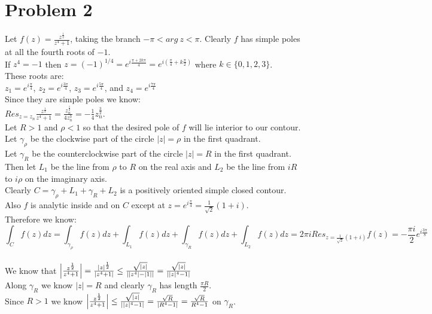 \documentclass{article}
\begin{document}
\section*{Problem 2}
\begin{center}
    \doublespacing
    Let $f(z) =\frac{z^{\frac{1}{2}}}{z^4 + 1}$, taking the branch $-\pi < arg\:z <\pi$. Clearly $f$ has simple poles at all the fourth roots of $-1$.
    \\If $z^4 = -1$ then $z = (-1)^{1/4} = e^{i\frac{\pi + 2k\pi}{4}} = e^{i(\frac{\pi}{4} + k\frac{\pi}{2})}$ where $k\in\{0, 1, 2, 3\}$.
    \\These roots are:
    \\$z_1 = e^{i\frac{\pi}{4}}$, $z_2 = e^{i\frac{3\pi}{4}}$, $z_3 = e^{i\frac{5\pi}{4}}$, and $z_4 = e^{i\frac{7\pi}{4}}$
    \\Since they are simple poles we know:
    \\$Res_{z = z_n}\frac{z^{\frac{1}{2}}}{z^4 + 1} =\frac{z_n^{\frac{1}{2}}}{4z_n^3} = -\frac{1}{4} z_n^{\frac{3}{2}}$.
    \\Let $R > 1$ and $\rho < 1$ so that the desired pole of $f$ will lie interior to our contour.
    \\Let $\gamma _{\rho}$ be the clockwise part of the circle $|z| =\rho$ in the first quadrant.
    \\Let $\gamma _R$ be the counterclockwise part of the circle $|z| = R$ in the first quadrant.
    \\Then let $L_1$ be the line from $\rho$ to $R$ on the real axis and $L_2$ be the line from $iR$ to $i\rho$ on the imaginary axis.
    \\Clearly $C =\gamma _{\rho} + L_1 +\gamma _R + L_2$ is a positively oriented simple closed contour.
    \\Also $f$ is analytic inside and on $C$ except at $z = e^{i\frac{\pi}{4}} =\frac{1}{\sqrt{2}}(1 + i)$.
    \\Therefore we know:
    \[\int _C f(z) dz =\int _{\gamma _{\rho}} f(z) dz +\int _{L_1} f(z) dz +\int _{\gamma _R} f(z) dz +\int _{L_2} f(z) dz = 2\pi i Res_{z=\frac{1}{\sqrt{2}}(1 + i)} f(z) = -\frac{\pi i}{2} e^{i\frac{3\pi}{8}}\]
    \\We know that $\Big{|}\frac{z^{\frac{1}{2}}}{z^4 + 1}\Big{|} =\frac{|z|^{\frac{1}{2}}}{|z^4 + 1|}\leq\frac{\sqrt{|z|}}{||z^4| - |1||} =\frac{\sqrt{|z|}}{||z|^4 - 1|}$
    \\Along $\gamma _R$ we know $|z| = R$ and clearly $\gamma _R$ has length $\frac{\pi R}{2}$.
    \\Since $R > 1$ we know $\Big{|}\frac{z^{\frac{1}{2}}}{z^4 + 1}\Big{|}\leq\frac{\sqrt{|z|}}{||z|^4 - 1|} =\frac{\sqrt{R}}{|R^4 - 1|} =\frac{\sqrt{R}}{R^4 - 1}$ on $\gamma _R$.

\end{center}
\end{document}
